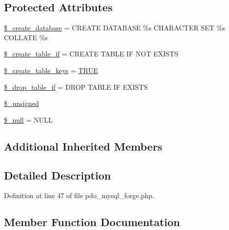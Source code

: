 \subsection*{Protected Attributes}
\begin{DoxyCompactItemize}
\item 
\mbox{\hyperlink{class_c_i___d_b__pdo__mysql__forge_acd23c9a8735806155f1a5d0a87c151f2}{\$\+\_\+create\+\_\+database}} = \textquotesingle{}C\+R\+E\+A\+TE D\+A\+T\+A\+B\+A\+SE \%s C\+H\+A\+R\+A\+C\+T\+ER S\+ET \%s C\+O\+L\+L\+A\+TE \%s\textquotesingle{}
\item 
\mbox{\hyperlink{class_c_i___d_b__pdo__mysql__forge_a2f6484fcb8d1dc3eef67a637227cd583}{\$\+\_\+create\+\_\+table\+\_\+if}} = \textquotesingle{}C\+R\+E\+A\+TE T\+A\+B\+LE IF N\+OT E\+X\+I\+S\+TS\textquotesingle{}
\item 
\mbox{\hyperlink{class_c_i___d_b__pdo__mysql__forge_a73e07acdd35c948ad353903c2827af6e}{\$\+\_\+create\+\_\+table\+\_\+keys}} = \mbox{\hyperlink{constants_8php_ae04a3efe6aa42044f803ee90c2277846}{T\+R\+UE}}
\item 
\mbox{\hyperlink{class_c_i___d_b__pdo__mysql__forge_a92a8a9145a7fc91e252e58d019373581}{\$\+\_\+drop\+\_\+table\+\_\+if}} = \textquotesingle{}D\+R\+OP T\+A\+B\+LE IF E\+X\+I\+S\+TS\textquotesingle{}
\item 
\mbox{\hyperlink{class_c_i___d_b__pdo__mysql__forge_aae977ae6d61fa183f0b25422b6ddc31c}{\$\+\_\+unsigned}}
\item 
\mbox{\hyperlink{class_c_i___d_b__pdo__mysql__forge_ae58fe6a5104d4a069a49b27533ce808f}{\$\+\_\+null}} = \textquotesingle{}N\+U\+LL\textquotesingle{}
\end{DoxyCompactItemize}
\subsection*{Additional Inherited Members}


\subsection{Detailed Description}


Definition at line 47 of file pdo\+\_\+mysql\+\_\+forge.\+php.



\subsection{Member Function Documentation}
\mbox{\label{class_c_i___d_b__pdo__mysql__forge_a41c6cae02f2fda8b429ad0afb9509426}} 
